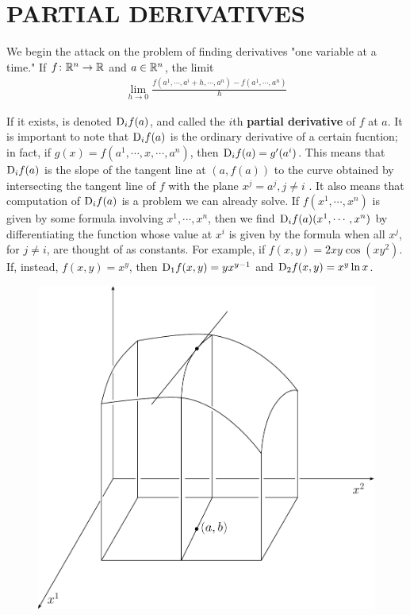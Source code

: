 \clearpage
\section[\textsc{partial derivatives}]{PARTIAL DERIVATIVES}
We begin the attack on the problem of finding derivatives
"one variable at a time." If $f\colon{} \mathbb{R}^n\to \mathbb{R}$ and $a\in \mathbb{R}^n$, 
the limit
\begin{align}
    \lim_{h\to 0} \frac{f(a^1, \cdots, a^i+h, \cdots, a^n) - f(a^1, \cdots, a^n)}{h}
\end{align}

If it exists, is denoted $\mathrm{D}_if(a)$, and called the $i$th \textbf{partial derivative} 
of $f$ at $a$. It is important to note that $\mathrm{D}_if(a)$ is the ordinary derivative of
a certain fucntion; in fact, if $g(x) = f(a^1, \cdots, x, \cdots, a^n)$, then $\mathrm{D}_if(a) = g'(a^i)$.
This means that $\mathrm{D}_if(a)$ is the slope of the tangent line at $(a, f(a))$ to the 
curve obtained by intersecting the tangent line of $f$ with the plane $x^j=a^j, j\neq i$ .
It also means that computation of $\mathrm{D}_if(a)$ is a problem we can already solve. If $f(x^1, \cdots, x^n)$
is given by some formula involving $x^1, \cdots, x^n$, then we find $\mathrm{D}_if(a)(x^1, \cdots, x^n)$ by differentiating 
the function whose value at $x^i$ is given by the formula when all $x^j$, for $j\neq i$, are 
thought of as constants. For example, if $f(x, y) = 2xy\cos(xy^2)$. If, instead, $f(x, y)= x^y$, then 
$\mathrm{D}_1f(x, y) = yx^{y-1}$ and $\mathrm{D}_2f(x, y) = x^y \ln x$. 

\begin{figure}[!htb]
    \centering
    \includegraphics[width=.75\linewidth]{./pics/Fig2-1.pdf}
    \caption{}
    \label{Fig 2-1}
\end{figure}

